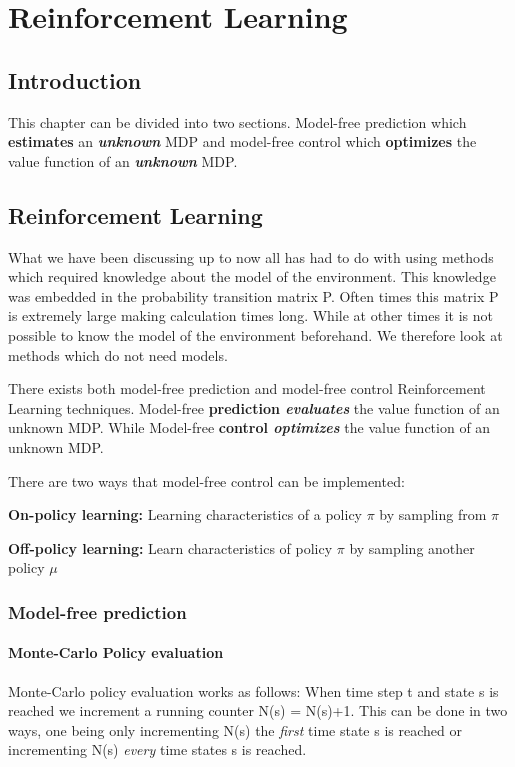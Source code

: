\graphicspath{{RL/fig}}
\chapter{Reinforcement Learning}
\label{chap:RL}

\section{Introduction}
This chapter can be divided into two sections. Model-free prediction which \textbf{estimates} an \textit{\textbf{unknown}} MDP and model-free control which \textbf{optimizes} the value function of an \textit{\textbf{unknown}} MDP.



\section{Reinforcement Learning}
What we have been discussing up to now all has had to do with using methods which required knowledge about the model of the environment. This knowledge was embedded in the probability transition matrix P. Often times this matrix P is extremely large making calculation times long. While at other times it is not possible to know the model of the environment beforehand. We therefore look at methods which do not need models.

There exists both model-free prediction and model-free control Reinforcement Learning techniques.
Model-free \textbf{prediction \textit{evaluates}} the value function of an unknown MDP.
While Model-free \textbf{control \textit{optimizes}} the value function of an unknown MDP.

There are two ways that model-free control can be implemented:

\textbf{On-policy learning:}
Learning characteristics of a policy $\pi$ by sampling from $\pi$

\textbf{Off-policy learning:}
Learn characteristics of policy $\pi$ by sampling another policy $\mu$

\subsection{Model-free prediction}
\subsubsection{Monte-Carlo Policy evaluation}
Monte-Carlo policy evaluation works as follows:
When time step t and state s is reached we increment a running counter N(s) = N(s)+1. This can be done in two ways, one being only incrementing N(s) the \textit{first} time state s is reached or incrementing N(s) \textit{every} time states s is reached.

